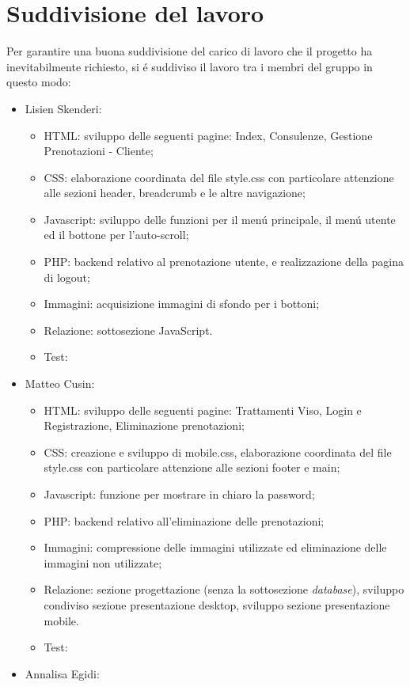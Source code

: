 \documentclass{article}
\begin{document}
\section{Suddivisione del lavoro}
Per garantire una buona suddivisione del carico di lavoro che il progetto ha inevitabilmente richiesto, si é suddiviso il lavoro tra i membri del gruppo in questo modo:
\begin{itemize}
	\item Lisien Skenderi: 
	\begin{itemize}
		\item HTML: sviluppo delle seguenti pagine: Index, Consulenze, Gestione Prenotazioni - Cliente;
		\item CSS:  elaborazione coordinata del file style.css con particolare attenzione alle sezioni header, breadcrumb e le altre navigazione;
		\item Javascript: sviluppo delle funzioni per il menú principale, il menú utente ed il bottone per l'auto-scroll;
		\item PHP: backend relativo al prenotazione utente, e realizzazione della pagina di logout;
		\item Immagini: acquisizione immagini di sfondo per i bottoni;
		\item Relazione: sottosezione JavaScript.
		\item Test:
	\end{itemize}
	\item Matteo Cusin:
	\begin{itemize}
		\item HTML: sviluppo delle seguenti pagine: Trattamenti Viso, Login e Registrazione, Eliminazione prenotazioni;
		\item CSS: creazione e sviluppo di mobile.css, elaborazione coordinata del file style.css con particolare attenzione alle sezioni footer e main;
		\item Javascript: funzione per mostrare in chiaro la password;
		\item PHP: backend relativo all'eliminazione delle prenotazioni;
		\item Immagini: compressione delle immagini utilizzate ed eliminazione delle immagini non utilizzate;
		\item Relazione: sezione progettazione (senza la sottosezione \textit{database}), sviluppo condiviso sezione presentazione desktop, sviluppo sezione presentazione mobile.
		\item Test:
	\end{itemize} 
	\item Annalisa Egidi:

\end{itemize}
\end{document}
